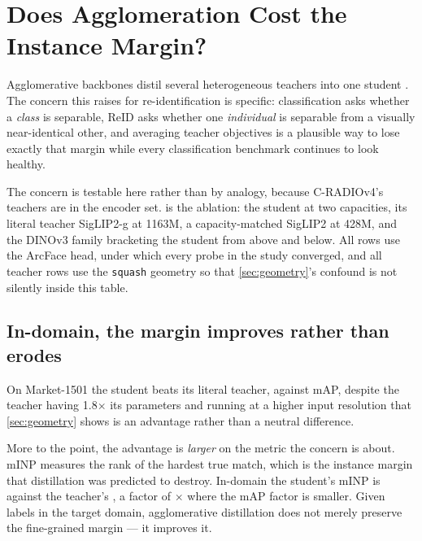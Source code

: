 \section{Does Agglomeration Cost the Instance Margin?}\label{sec:ablation}
Agglomerative backbones distil several heterogeneous teachers into one student
\cite{ranzinger2024amradio,heinrich2025radiov25}. The concern this raises for
re-identification is specific: classification asks whether a \emph{class} is separable, ReID
asks whether one \emph{individual} is separable from a visually near-identical other, and
averaging teacher objectives is a plausible way to lose exactly that margin while every
classification benchmark continues to look healthy.

The concern is testable here rather than by analogy, because C-RADIOv4's teachers are in the
encoder set.  is the ablation: the student at two capacities, its literal
teacher SigLIP2-g at 1163M, a capacity-matched SigLIP2 at 428M, and the DINOv3
family bracketing the student from above and below. All rows use the ArcFace head, under which
every probe in the study converged, and all teacher rows use the \texttt{squash} geometry so
that \cref{sec:geometry}'s confound is not silently inside this table.

\begin{table}[t]
\centering
\caption{The teacher ablation, ArcFace mAP. C-RADIOv4 is a student of the SigLIP2 and DINOv3
families; SigLIP2-g is the literal teacher. \emph{role} names that relation. Market-1501 is the
only column whose identities any head has seen. DINOv3 stands in for a teacher family, not for
the actual DINOv3-7B teacher, which does not fit on this study's GPU.}
\label{tab:ablation}
\small

\end{table}

\subsection{In-domain, the margin improves rather than erodes}
On Market-1501 the student beats its literal teacher, \studentMarket{} against
\teacherMarket{} mAP, despite the teacher having 1.8$\times$ its parameters and running
at a higher input resolution that \cref{sec:geometry} shows is an advantage rather than a
neutral difference.

More to the point, the advantage is \emph{larger} on the metric the concern is about. mINP
\cite{ye2022deep} measures the rank of the hardest true match, which is the instance margin
that distillation was predicted to destroy. In-domain the student's mINP is
\leadMarketMINP{} against the teacher's \teacherMarketMINP{}, a factor of \minpGap{}$\times$
where the mAP factor is smaller. Given labels in the target domain, agglomerative distillation
does not merely preserve the fine-grained margin --- it improves it.

